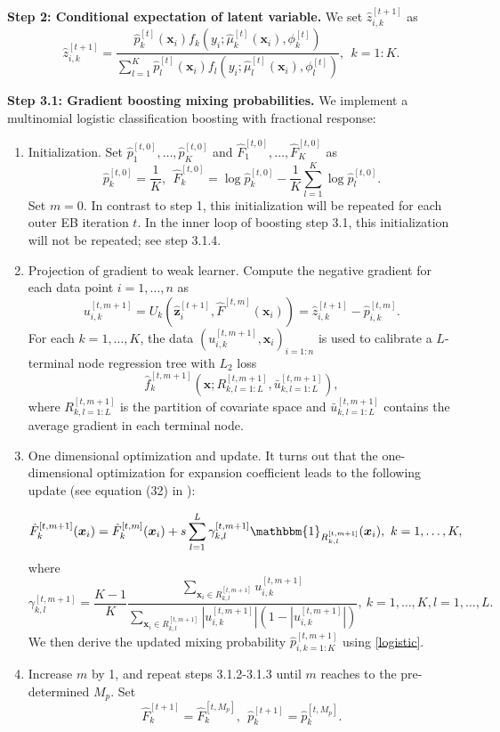 \documentclass[11pt]{article}
\numberwithin{equation}{section}
\def\bx{\boldsymbol{x}}
\def\bz{\boldsymbol{z}}
\begin{document}
{\bf Step 2: Conditional expectation of latent variable.} We set  $\hat{z}_{i,k}^{[t+1]}$ as
	\begin{equation*}
		\hat{z}_{i,k}^{[t+1]}=\frac{\hat{p}_{k}^{[t]}(\bx_i) f_{k}\left(y_i ; \hat{\mu}_{k}^{[t]}(\bx_i), \phi_k^{[t]} \right)}{\sum_{l=1}^{K} \hat{p}_{l}^{[t]}(\bx_i) f_{l}\left(y_i ; \hat{\mu}_{l}^{[t]}(\bx_i), \phi_l^{[t]}\right)},~~ k=1:K.
	\end{equation*}


{\bf Step 3.1: Gradient boosting mixing probabilities.} We implement a multinomial logistic classification boosting with fractional response: 
	\begin{enumerate}
		\item[3.1.1] Initialization. Set $\hat{p}_1^{[t,0]}, \ldots, \hat{p}_K^{[t,0]}$ and $\hat{F}_1^{[t,0]}, \ldots, \hat{F}_{K}^{[t,0]}$ as
		\begin{equation}\label{ini-1}			
		\hat{p}_k^{[t,0]}=\frac{1}{K},
		~~\hat{F}_k^{[t,0]}=\log \hat{p}_k^{[t,0]}-\frac{1}{K}\sum_{l=1}^K\log \hat{p}_l^{[t,0]}.
	\end{equation}
		Set $m=0$. In contrast to step 1, this initialization will be repeated for each outer EB iteration $t$.
		In the inner loop of boosting step 3.1, this initialization will not be repeated; see step 3.1.4. 
		\item[3.1.2] Projection of gradient to weak learner.
		Compute the negative gradient for each data point $i=1,\ldots,n$ as
		$$u_{i,k}^{[t,m+1]}=U_k(\hat{\bz}_{i}^{[t+1]},\hat{F}^{[t,m]}(\bx_i))=\hat{z}_{i,k}^{[t+1]}-\hat{p}_{i,k}^{[t,m]}.$$
		For each $k=1,\ldots, K$, the data $(u_{i,k}^{[t,m+1]},\bx_i)_{i=1:n}$ is used to calibrate a $L$-terminal node regression tree with $L_2$ loss $$\hat{f}_k^{[t,m+1]}\left(\bx;R^{[t,m+1]}_{k,l=1:L},\bar{u}^{[t,m+1]}_{k,l=1:L}\right),$$
		where $R^{[t,m+1]}_{k,l=1:L}$ is the partition of covariate space and $\bar{u}^{[t,m+1]}_{k,l=1:L}$ contains the average gradient in each terminal node.
		
		
	
		\item[3.1.3] One dimensional optimization and update. It turns out that  the one-dimensional optimization for expansion coefficient leads to the following update (see equation (32) in \citet{friedman2001greedy}):
		
		$$\hat{F}_k^{[t,m+1]}(\bx_i)=\hat{F}_k^{[t,m]}(\bx_i)+s\sum_{l=1}^L\gamma^{[t,m+1]}_{k,l}\mathbbm{1}_{R^{[t,m+1]}_{k,l}}(\bx_i),~ k=1,\ldots,K,$$
		where
		$$\gamma^{[t,m+1]}_{k,l}=\frac{K-1}{K}\frac{\sum_{\bx_i\in R_{k,l}^{[t,m+1]}}u_{i,k}^{[t,m+1]}}{\sum_{\bx_i\in R_{k,l}^{[t,m+1]}}\left|u_{i,k}^{[t,m+1]}\right|\left(1-\left|u_{i,k}^{[t,m+1]}\right|\right)}, ~k=1,\ldots,K, l=1,\ldots,L.$$
		We then derive the updated mixing probability $\hat{p}^{[t,m+1]}_{i,k=1:K}$  using \eqref{logistic}.
		
		
	
		\item[3.1.4] Increase $m$ by 1, and repeat steps 3.1.2-3.1.3  until $m$ reaches to the pre-determined $M_p$.
		Set $$\hat{F}_k^{[t+1]}=\hat{F}_k^{[t,M_p]},~~\hat{p}_k^{[t+1]}=\hat{p}_k^{[t,M_p]}.$$
	\end{enumerate}
\end{document}
